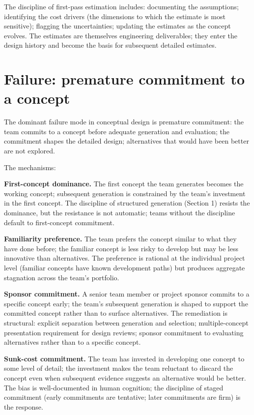 The discipline of first-pass estimation includes: documenting the assumptions; identifying the cost drivers (the dimensions to which the estimate is most sensitive); flagging the uncertainties; updating the estimates as the concept evolves. The estimates are themselves engineering deliverables; they enter the design history and become the basis for subsequent detailed estimates.

\section{Failure: premature commitment to a concept}

The dominant failure mode in conceptual design is premature commitment: the team commits to a concept before adequate generation and evaluation; the commitment shapes the detailed design; alternatives that would have been better are not explored.

The mechanisms:

\textbf{First-concept dominance.} The first concept the team generates becomes the working concept; subsequent generation is constrained by the team's investment in the first concept. The discipline of structured generation (Section 1) resists the dominance, but the resistance is not automatic; teams without the discipline default to first-concept commitment.

\textbf{Familiarity preference.} The team prefers the concept similar to what they have done before; the familiar concept is less risky to develop but may be less innovative than alternatives. The preference is rational at the individual project level (familiar concepts have known development paths) but produces aggregate stagnation across the team's portfolio.

\textbf{Sponsor commitment.} A senior team member or project sponsor commits to a specific concept early; the team's subsequent generation is shaped to support the committed concept rather than to surface alternatives. The remediation is structural: explicit separation between generation and selection; multiple-concept presentation requirement for design reviews; sponsor commitment to evaluating alternatives rather than to a specific concept.

\textbf{Sunk-cost commitment.} The team has invested in developing one concept to some level of detail; the investment makes the team reluctant to discard the concept even when subsequent evidence suggests an alternative would be better. The bias is well-documented in human cognition; the discipline of staged commitment (early commitments are tentative; later commitments are firm) is the response.

